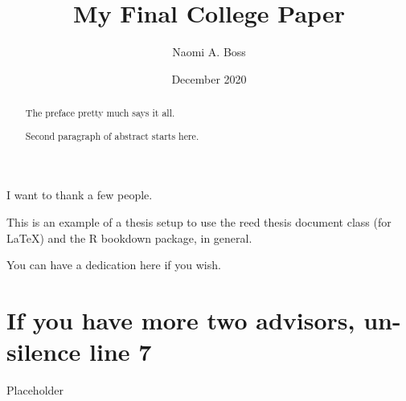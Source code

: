 \documentclass[12pt,twoside]{reedthesis}
\title{My Final College Paper}
\author{Naomi A. Boss}
\date{December 2020}
\begin{document}
  \maketitle

\frontmatter %
\pagestyle{empty} %
  \begin{acknowledgements}
    I want to thank a few people.
  \end{acknowledgements}
  \begin{preface}
    This is an example of a thesis setup to use the reed thesis document class
    (for LaTeX) and the R bookdown package, in general.
  \end{preface}
  \hypersetup{linkcolor=black}
  \setcounter{tocdepth}{2}
  \tableofcontents

  \listoftables

  \listoffigures
  \begin{abstract}
    The preface pretty much says it all.
    
    \par
    
    Second paragraph of abstract starts here.
  \end{abstract}
  \begin{dedication}
    You can have a dedication here if you wish.
  \end{dedication}
\mainmatter %
\pagestyle{fancyplain} %

\hypertarget{if-you-have-more-two-advisors-un-silence-line-7}{%
\chapter{If you have more two advisors, un-silence line 7}\label{if-you-have-more-two-advisors-un-silence-line-7}}

Placeholder
\end{document}
